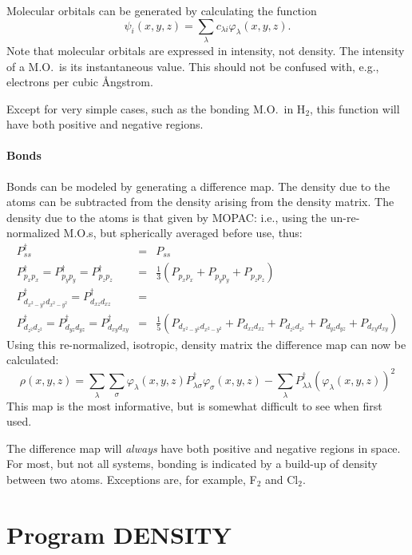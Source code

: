 Molecular orbitals can be generated by calculating the function
$$
\psi_i(x,y,z) = \sum_{\lambda}c_{\lambda i}\varphi_{\lambda}(x,y,z).
$$
Note that molecular orbitals are expressed in intensity, not density.
The intensity of a M.O.\ is its instantaneous value.  This should not
be confused with, e.g., electrons per cubic \AA ngstrom.

Except for very simple cases, such as the bonding M.O.\ in H$_2$, this function
will have both positive and negative regions.

\paragraph*{Bonds}
Bonds can be modeled by generating a difference map.  The density due to
the atoms can be subtracted from the density arising from the density matrix.
The density due to the atoms is that given by MOPAC: i.e., using the
un-re-normalized M.O.s, but spherically averaged before use, thus:
\begin{eqnarray}
P^{\dagger}_{ss}& =& P_{ss} \nonumber \\
P^{\dagger}_{p_xp_x}= P^{\dagger}_{p_yp_y}=P^{\dagger}_{p_zp_z}& =&\frac{1}{3}(P_{p_xp_x}+P_{p_yp_y}+P_{p_zp_z})\nonumber \\
P^{\dagger}_{d_{x^2-y^2}d_{x^2-y^2}}=P^{\dagger}_{d_{xz}d_{xz}} &=&\nonumber \\
P^{\dagger}_{d_{z^2}d_{z^2}}= P^{\dagger}_{d_{yz }d_{yz }}=P^{\dagger}_{d_{xy }d_{xy }}&=&\frac{1}{5}(P_{d_{x^2-y^2}d_{x^2-y^2}} +P_{d_{xz}d_{xz}} +P_{d_{z^2}d_{z^2}} +
P_{d_{yz }d_{yz }}+P_{d_{xy }d_{xy }}) \nonumber
\end{eqnarray}
Using this re-normalized, isotropic, density matrix the difference map can now be
calculated:
$$
\rho(x,y,z) = \sum_{\lambda}\sum_{\sigma}
\varphi_{\lambda}(x,y,z)P_{\lambda\sigma}^{\dagger}\varphi_{\sigma}(x,y,z) -\sum_{\lambda}
P^{\dagger}_{\lambda\lambda}(\varphi_{\lambda}(x,y,z))^2
$$
This map is the most informative, but is somewhat difficult to see when first used.

The difference map will {\em always} have both positive and negative regions in
space.  For most, but not all systems, bonding is indicated by a build-up of
density between two atoms.  Exceptions are, for example, F$_2$ and Cl$_2$.


\section{Program DENSITY}

